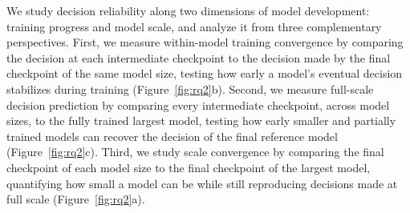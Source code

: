 
We study decision reliability along two dimensions of model development: training progress and model scale, and analyze it from three complementary perspectives. First, we measure within-model training convergence by comparing the decision at each intermediate checkpoint to the decision made by the final checkpoint of the same model size, testing how early a model's eventual decision stabilizes during training (Figure~\ref{fig:rq2}b). Second, we measure full-scale decision prediction by comparing every intermediate checkpoint, across model sizes, to the fully trained largest model, testing how early smaller and partially trained models can recover the decision of the final reference model (Figure~\ref{fig:rq2}c). Third, we study scale convergence by comparing the final checkpoint of each model size to the final checkpoint of the largest model, quantifying how small a model can be while still reproducing decisions made at full scale (Figure~\ref{fig:rq2}a).

